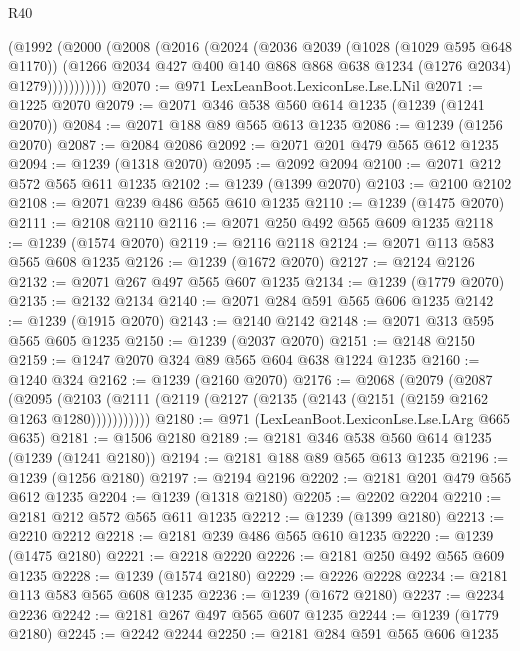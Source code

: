 \begin{lexlean}{R40}
\begin{coremodule}
            (@1992
              (@2000
                (@2008
                  (@2016
                    (@2024
                      (@2036
                        @2039
                        (@1028 (@1029 @595 @648 @1170))
                        (@1266
                          @2034
                          @427
                          @400
                          @140
                          @868
                          @868
                          @638
                          @1234
                          (@1276 @2034)
                          @1279)))))))))))
@2070 := @971 LexLeanBoot.LexiconLse.Lse.LNil
@2071 := @1225 @2070
@2079 := @2071 @346 @538 @560 @614 @1235 (@1239 (@1241 @2070))
@2084 := @2071 @188 @89 @565 @613 @1235
@2086 := @1239 (@1256 @2070)
@2087 := @2084 @2086
@2092 := @2071 @201 @479 @565 @612 @1235
@2094 := @1239 (@1318 @2070)
@2095 := @2092 @2094
@2100 := @2071 @212 @572 @565 @611 @1235
@2102 := @1239 (@1399 @2070)
@2103 := @2100 @2102
@2108 := @2071 @239 @486 @565 @610 @1235
@2110 := @1239 (@1475 @2070)
@2111 := @2108 @2110
@2116 := @2071 @250 @492 @565 @609 @1235
@2118 := @1239 (@1574 @2070)
@2119 := @2116 @2118
@2124 := @2071 @113 @583 @565 @608 @1235
@2126 := @1239 (@1672 @2070)
@2127 := @2124 @2126
@2132 := @2071 @267 @497 @565 @607 @1235
@2134 := @1239 (@1779 @2070)
@2135 := @2132 @2134
@2140 := @2071 @284 @591 @565 @606 @1235
@2142 := @1239 (@1915 @2070)
@2143 := @2140 @2142
@2148 := @2071 @313 @595 @565 @605 @1235
@2150 := @1239 (@2037 @2070)
@2151 := @2148 @2150
@2159 := @1247 @2070 @324 @89 @565 @604 @638 @1224 @1235
@2160 := @1240 @324
@2162 := @1239 (@2160 @2070)
@2176 := @2068
    (@2079
      (@2087
        (@2095 (@2103 (@2111 (@2119 (@2127 (@2135 (@2143 (@2151 (@2159 @2162 @1263 @1280)))))))))))
@2180 := @971 (LexLeanBoot.LexiconLse.Lse.LArg @665 @635)
@2181 := @1506 @2180
@2189 := @2181 @346 @538 @560 @614 @1235 (@1239 (@1241 @2180))
@2194 := @2181 @188 @89 @565 @613 @1235
@2196 := @1239 (@1256 @2180)
@2197 := @2194 @2196
@2202 := @2181 @201 @479 @565 @612 @1235
@2204 := @1239 (@1318 @2180)
@2205 := @2202 @2204
@2210 := @2181 @212 @572 @565 @611 @1235
@2212 := @1239 (@1399 @2180)
@2213 := @2210 @2212
@2218 := @2181 @239 @486 @565 @610 @1235
@2220 := @1239 (@1475 @2180)
@2221 := @2218 @2220
@2226 := @2181 @250 @492 @565 @609 @1235
@2228 := @1239 (@1574 @2180)
@2229 := @2226 @2228
@2234 := @2181 @113 @583 @565 @608 @1235
@2236 := @1239 (@1672 @2180)
@2237 := @2234 @2236
@2242 := @2181 @267 @497 @565 @607 @1235
@2244 := @1239 (@1779 @2180)
@2245 := @2242 @2244
@2250 := @2181 @284 @591 @565 @606 @1235

\end{coremodule}
\end{lexlean}
